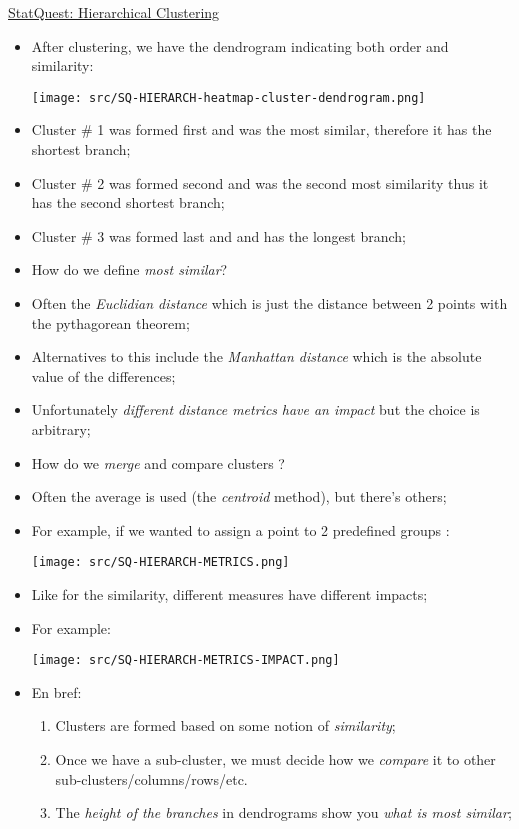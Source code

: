 \documentclass[12pt, titlepage, french]{report}
\begin{document}
\begin{YTB_SUMM}{\href{https://www.youtube.com/watch?v=7xHsRkOdVwo&list=PLblh5JKOoLUICTaGLRoHQDuF_7q2GfuJF&index=31}{StatQuest: Hierarchical Clustering}}
\begin{itemize}
\begin{enumerate}
		\texttt{[image: src/SQ-HIERARCH-heatmap-cluster-2.png]}
		\item	We go back to the first step, but since there's only 2 clusters left we merge them;
		\end{enumerate}
	\item	After clustering, we have the dendrogram indicating both order and similarity:
	
	\texttt{[image: src/SQ-HIERARCH-heatmap-cluster-dendrogram.png]}
	\item[]	Cluster \# 1 was formed first and was the most similar, therefore it has the shortest branch;
	\item[]	Cluster \# 2 was formed second and was the second most similarity thus it has the second shortest branch;
	\item[]	Cluster \# 3 was formed last and and has the longest branch;
	\item	How do we define \textit{most similar}?
	\item[]	Often the \textit{Euclidian distance} which is just the distance between 2 points with the pythagorean theorem;
	\item[]	Alternatives to this include the \textit{Manhattan distance} which is the absolute value of the differences;
	\item[]	Unfortunately \textit{different distance metrics} \textit{have an impact} but the choice is arbitrary;
	\item	How do we \textit{merge} and compare clusters ?
	\item[]	Often the average is used (the \textit{centroid} method), but there's others;
	\item[]	For example, if we wanted to assign a point to 2 predefined groups :
	
	\texttt{[image: src/SQ-HIERARCH-METRICS.png]}
	\item[]	Like for the similarity, different measures have different impacts;
	\item[]	For example:
	
	\texttt{[image: src/SQ-HIERARCH-METRICS-IMPACT.png]}
	\item	En bref: 
		\begin{enumerate}
		\item	Clusters are formed based on some notion of \textit{similarity};
		\item	Once we have a sub-cluster, we must decide how we \textit{compare} it to other sub-clusters/columns/rows/etc.
		\item	The \textit{height of the branches} in dendrograms show you \textit{what is most similar};
		\end{enumerate}
\end{itemize}
\end{YTB_SUMM}
\end{document}
